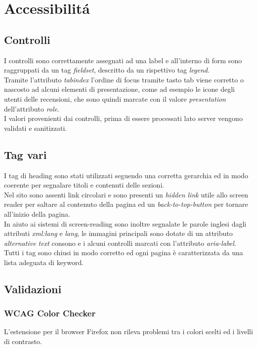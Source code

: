 \section{Accessibilitá}

\subsection{Controlli}
I controlli sono correttamente assegnati ad una label e all'interno di form sono raggruppati da un tag \textit{fieldset}, descritto da un rispettivo tag \textit{legend}.\\
Tramite l'attributo \textit{tabindex} l'ordine di focus tramite tasto tab viene corretto o nascosto ad alcuni elementi di presentazione, come ad esempio le icone degli utenti delle recensioni, che sono quindi marcate con il valore \textit{presentation} dell'attributo \textit{role}.\\
I valori provenienti dai controlli, prima di essere processati lato server vengono validati e sanitizzati.

\subsection{Tag vari}
I tag di heading sono stati utilizzati seguendo una corretta gerarchia ed in modo coerente per segnalare titoli e contenuti delle sezioni.\\
Nel sito sono assenti link circolari e sono presenti un \textit{hidden link} utile allo screen reader per saltare al contenuto della pagina ed un \textit{back-to-top-button} per tornare all'inizio della pagina.\\
In aiuto ai sistemi di screen-reading sono inoltre segnalate le parole inglesi dagli attributi \textit{xml:lang} e \textit{lang}, le immagini principali sono dotate di un attributo \textit{alternative text} consono e i alcuni controlli marcati con l'attributo \textit{aria-label}.\\
Tutti i tag sono chiusi in modo corretto ed ogni pagina è caratterizzata da una lista adeguata di keyword.

\subsection{Validazioni}


\subsubsection{WCAG Color Checker}
L'estensione per il browser Firefox non rileva problemi tra i colori scelti ed i livelli di contrasto.

